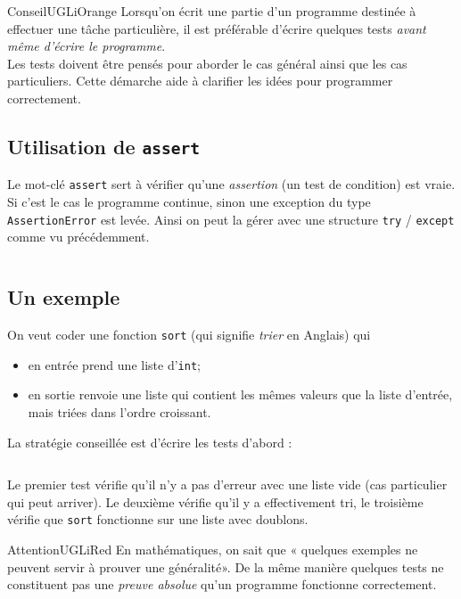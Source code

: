 \documentclass[a4paper,10pt,cours]{nsi}
\newcommand{\file}[1]{\inputminted{python}{#1}}
\begin{document}
\begin{encadrecolore}{Conseil}{UGLiOrange}
    Lorsqu'on écrit une partie d'un programme destinée à effectuer une tâche particulière, il est préférable d'écrire quelques tests \textit{avant même d'écrire le programme}.\\
    Les tests doivent être pensés pour aborder le cas général ainsi que les cas particuliers. Cette démarche aide à clarifier les idées pour programmer correctement.
\end{encadrecolore}

\subsection{Utilisation de \texttt{assert}}

Le mot-clé \texttt{assert} sert à vérifier qu'une \textit{assertion} (un test de condition) est vraie. Si c'est le cas le programme continue, sinon une exception du type \texttt{AssertionError} est levée. Ainsi on peut la gérer avec une structure \texttt{try} / \texttt{except} comme vu précédemment.

\begin{pyc}
    \file{scripts/assert1.py}
\end{pyc}
\subsection{Un exemple}

On veut coder une fonction \texttt{sort} (qui signifie \textit{trier} en Anglais) qui 
\begin{itemize}
    \item   en entrée prend une liste d'\texttt{int};
    \item   en sortie renvoie une liste qui contient les mêmes valeurs que la liste d'entrée, mais triées dans l'ordre croissant.
\end{itemize}

La stratégie conseillée est d'écrire les tests d'abord :
\begin{pyc}
\file{scripts/assert2.py}
\end{pyc}
Le premier test vérifie qu'il n'y a pas d'erreur avec une liste vide (cas particulier qui peut arriver). Le deuxième vérifie qu'il y a effectivement tri, le troisième vérifie que \texttt{sort} fonctionne sur une liste avec doublons.

\begin{encadrecolore}{Attention}{UGLiRed}
    En mathématiques, on sait que « quelques exemples ne peuvent servir à prouver une généralité». De la même manière quelques tests ne constituent pas une \textit{preuve absolue} qu'un programme fonctionne correctement.
\end{encadrecolore}
\end{document}
